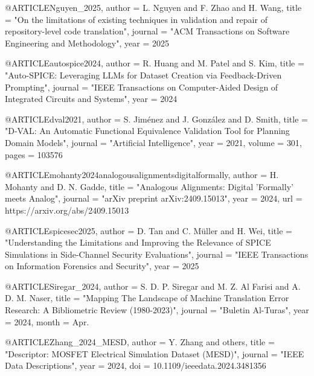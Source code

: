 \documentclass[conference]{IEEEtran}
\begin{document}
@ARTICLE{Nguyen_2025,
    author      =   {L. {Nguyen} and F. {Zhao} and H. {Wang}},
    title       =   "{On the limitations of existing techniques in validation and repair of repository-level code translation}",
    journal     =   "{ACM Transactions on Software Engineering and Methodology}",
    year        =   {2025}
}

@ARTICLE{autospice2024,
    author      =   {R. {Huang} and M. {Patel} and S. {Kim}},
    title       =   "{Auto-{SPICE}: Leveraging {LLMs} for Dataset Creation via Feedback-Driven Prompting}",
    journal     =   "{IEEE Transactions on Computer-Aided Design of Integrated Circuits and Systems}",
    year        =   {2024}
}

@ARTICLE{dval2021,
    author      =   {S. {Jiménez} and J. {González} and D. {Smith}},
    title       =   "{D-VAL: An Automatic Functional Equivalence Validation Tool for Planning Domain Models}",
    journal     =   "{Artificial Intelligence}",
    year        =   {2021},
    volume      =   {301},
    pages       =   {103576}
}

@ARTICLE{mohanty2024analogousalignmentsdigitalformally,
    author      =   {H. {Mohanty} and D. N. {Gadde}},
    title       =   "{Analogous Alignments: Digital 'Formally' meets Analog}",
    journal     =   "{arXiv preprint arXiv:2409.15013}",
    year        =   {2024},
    url         =   {https://arxiv.org/abs/2409.15013}
}

@ARTICLE{spicesec2025,
    author      =   {D. {Tan} and C. {Müller} and H. {Wei}},
    title       =   "{Understanding the Limitations and Improving the Relevance of {SPICE} Simulations in Side-Channel Security Evaluations}",
    journal     =   "{IEEE Transactions on Information Forensics and Security}",
    year        =   {2025}
}

@ARTICLE{Siregar_2024,
    author      =   {S. D. P. {Siregar} and M. Z. {Al Farisi} and A. D. M. {Naser}},
    title       =   "{Mapping The Landscape of Machine Translation Error Research: A Bibliometric Review (1980-2023)}",
    journal     =   "{Buletin Al-Turas}",
    year        =   {2024},
    month       =   {Apr.}
}


@ARTICLE{Zhang_2024_MESD,
    author      =   {Y. {Zhang} and others},
    title       =   "{Descriptor: {MOSFET} Electrical Simulation Dataset ({MESD})}",
    journal     =   "{IEEE Data Descriptions}",
    year        =   {2024},
    doi         =   {10.1109/ieeedata.2024.3481356}
}
\end{document}
